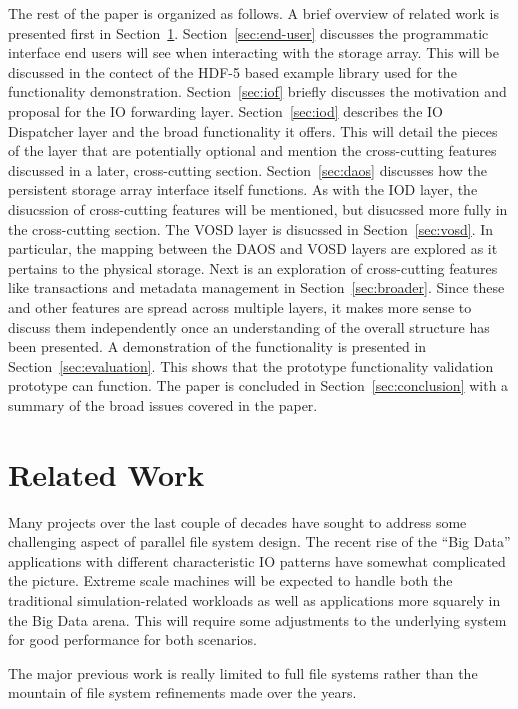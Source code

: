 \documentclass[conference]{IEEEtran}
\begin{document}
The rest of the paper is organized as follows. A brief overview of related work
is presented first in Section~\ref{sec:related}. Section~\ref{sec:end-user}
discusses the programmatic interface end users will see when interacting with
the storage array. This will be discussed in the contect of the HDF-5 based
example library used for the functionality demonstration. Section~\ref{sec:iof}
briefly discusses the motivation and proposal for the IO forwarding layer.
Section~\ref{sec:iod} describes the IO Dispatcher layer and the broad
functionality it offers. This will detail the pieces of the layer that are
potentially optional and mention the cross-cutting features discussed in a
later, cross-cutting section. Section~\ref{sec:daos} discusses how the
persistent storage array interface itself functions. As with the IOD layer, the
disucssion of cross-cutting features will be mentioned, but disucssed more
fully in the cross-cutting section. The VOSD layer is disucssed in
Section~\ref{sec:vosd}. In particular, the mapping between the DAOS and VOSD
layers are explored as it pertains to the physical storage. Next is an
exploration of cross-cutting features like transactions and metadata management
in Section~\ref{sec:broader}. Since these and other features are spread across
multiple layers, it makes more sense to discuss them independently once an
understanding of the overall structure has been presented.  A demonstration
of the functionality is presented in Section~\ref{sec:evaluation}. This shows
that the prototype functionality validation prototype can function. The paper
is concluded in Section~\ref{sec:conclusion} with a summary of the broad issues
covered in the paper.

\section{Related Work}
\label{sec:related}

Many projects over the last couple of decades have sought to address some
challenging aspect of parallel file system design. The recent rise of the ``Big
Data'' applications with different characteristic IO patterns have somewhat
complicated the picture. Extreme scale machines will be expected to handle both
the traditional simulation-related workloads as well as applications more
squarely in the Big Data arena. This will require some adjustments to the
underlying system for good performance for both scenarios.

The major previous work is really limited to full file systems rather than the
mountain of file system refinements made over the years.
\end{document}
